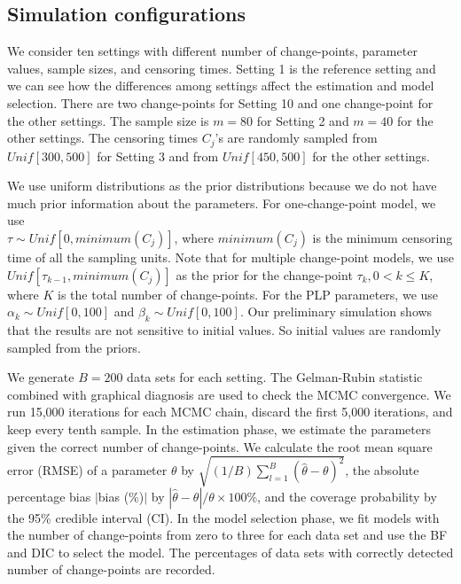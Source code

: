 \documentclass[12pt]{article}
\numberwithin{equation}{section}
\begin{document}
\subsection{Simulation configurations}
We consider ten settings with different number of change-points, parameter values, sample sizes, and censoring times. Setting 1 is the reference setting and we can see how the differences among settings affect the estimation and model selection. There are two change-points for Setting 10 and one change-point for  the other settings. The sample size is $m = 80$ for Setting 2 and $m = 40$ for the other settings. The censoring times $C_j$'s are randomly sampled from $Unif[300, 500]$ for Setting 3 and from $Unif[450, 500]$ for the other settings.  

We use uniform distributions as the prior distributions because we do not have much prior information about the parameters. For one-change-point model, we use\\ $\tau\sim Unif[0, minimum(C_j)]$, where $minimum(C_j)$ is the minimum censoring time of all the sampling units. Note that for multiple change-point models, we use $Unif[\tau_{k-1}, minimum(C_j)]$ as the prior for the change-point $\tau_{k}, 0<k\leq K$, where $K$ is the total number of change-points.
For the PLP parameters, we use $\alpha_k\sim Unif[0,100]$ and $\beta_k\sim Unif[0,100]$. Our preliminary simulation shows that the results are not sensitive to initial values. So initial values are randomly sampled from the priors.

We generate $B = 200$ data sets for each setting. The Gelman-Rubin statistic \citep{Gelman1992} combined with graphical diagnosis are used to check the MCMC convergence. We run 15,000 iterations for each MCMC chain, discard the first 5,000 iterations, and keep every tenth sample. In the estimation phase, we estimate the parameters given the correct number of change-points. We calculate the root mean square error (RMSE) of a parameter $\theta$ by
$\sqrt{(1/B)\sum\limits_{l=1}^{B}(\widehat{\theta}-\theta)^2}$, the absolute percentage bias  $|$bias (\%)$|$ by $|\widehat{\theta}-\theta|/\theta\times 100\%$, and the coverage probability by the 95\% credible interval (CI). In the model selection phase, we fit models with the number of change-points from zero to three for each data set and use the BF and DIC to select the model. The percentages of data sets with correctly detected number of change-points are recorded. 
\end{document}
